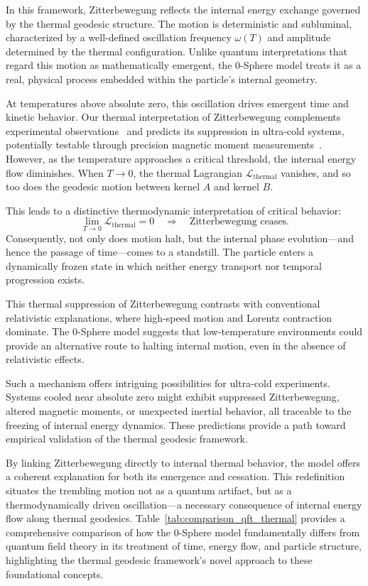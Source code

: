 \documentclass[%
 reprint,
 amsmath,amssymb,
 aps,
]{revtex4-1}
\numberwithin{equation}{section}%
\begin{document}
In this framework, Zitterbewegung reflects the internal energy exchange governed by the thermal geodesic structure. The motion is deterministic and subluminal, characterized by a well-defined oscillation frequency $\omega(T)$ and amplitude determined by the thermal configuration. Unlike quantum interpretations that regard this motion as mathematically emergent, the 0-Sphere model treats it as a real, physical process embedded within the particle's internal geometry.

At temperatures above absolute zero, this oscillation drives emergent time and kinetic behavior. Our thermal interpretation of Zitterbewegung complements experimental observations~\cite{gerritsma2010, leblanc2013} and predicts its suppression in ultra-cold systems, potentially testable through precision magnetic moment measurements~\cite{fan2023}. However, as the temperature approaches a critical threshold, the internal energy flow diminishes. When $T \to 0$, the thermal Lagrangian $\mathcal{L}_{\text{thermal}}$ vanishes, and so too does the geodesic motion between kernel $A$ and kernel $B$.

This leads to a distinctive thermodynamic interpretation of critical behavior:
\begin{equation} \label{eq:Lthermal_zero}
\lim_{T \to 0} \mathcal{L}_{\text{thermal}} = 0 \quad \Rightarrow \quad \text{Zitterbewegung ceases.}
\end{equation}
Consequently, not only does motion halt, but the internal phase evolution---and hence the passage of time---comes to a standstill. The particle enters a dynamically frozen state in which neither energy transport nor temporal progression exists.

This thermal suppression of Zitterbewegung contrasts with conventional relativistic explanations, where high-speed motion and Lorentz contraction dominate. The 0-Sphere model suggests that low-temperature environments could provide an alternative route to halting internal motion, even in the absence of relativistic effects.

Such a mechanism offers intriguing possibilities for ultra-cold experiments. Systems cooled near absolute zero might exhibit suppressed Zitterbewegung, altered magnetic moments, or unexpected inertial behavior, all traceable to the freezing of internal energy dynamics. These predictions provide a path toward empirical validation of the thermal geodesic framework.

By linking Zitterbewegung directly to internal thermal behavior, the model offers a coherent explanation for both its emergence and cessation. This redefinition situates the trembling motion not as a quantum artifact, but as a thermodynamically driven oscillation---a necessary consequence of internal energy flow along thermal geodesics. Table~\ref{tab:comparison_qft_thermal} provides a comprehensive comparison of how the 0-Sphere model fundamentally differs from quantum field theory in its treatment of time, energy flow, and particle structure, highlighting the thermal geodesic framework's novel approach to these foundational concepts.
\end{document}
